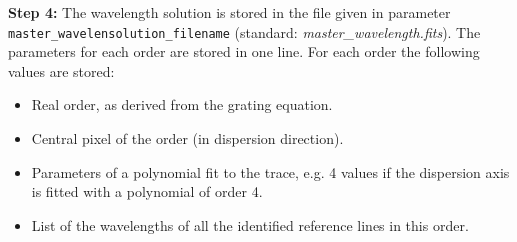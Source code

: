 \documentclass[10pt,a4paper]{article}
\begin{document}
\vspace{0.5em}\noindent \textbf{Step 4:} The wavelength solution is stored in the file given in parameter \verb|master_wavelensolution_filename| (standard: \textit{master\_wavelength.fits}). The parameters for each order are stored in one line. For each order the following values are stored:
\begin{itemize}
  \item Real order, as derived from the grating equation.
  \item Central pixel of the order (in dispersion direction).
  \item Parameters of a polynomial fit to the trace, e.g. 4 values if the dispersion axis is fitted with a polynomial of order 4.
  \item List of the wavelengths of all the identified reference lines in this order.
\end{itemize}
\end{document}
